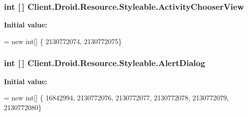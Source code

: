 \subsubsection[{Activity\+Chooser\+View}]{\setlength{\rightskip}{0pt plus 5cm}int \mbox{[}$\,$\mbox{]} Client.\+Droid.\+Resource.\+Styleable.\+Activity\+Chooser\+View\hspace{0.3cm}{\ttfamily [static]}}\label{classClient_1_1Droid_1_1Resource_1_1Styleable_a76fb7f3f865f999c48cefc7f3e0d010b}
{\bfseries Initial value\+:}
\begin{DoxyCode}
= \textcolor{keyword}{new} \textcolor{keywordtype}{int}[]
            \{
                    2130772074,
                    2130772075\}
\end{DoxyCode}
\hypertarget{classClient_1_1Droid_1_1Resource_1_1Styleable_ab0a0ece34f1e064fe26556955a3ba6c2}{}
\subsubsection[{Alert\+Dialog}]{\setlength{\rightskip}{0pt plus 5cm}int \mbox{[}$\,$\mbox{]} Client.\+Droid.\+Resource.\+Styleable.\+Alert\+Dialog\hspace{0.3cm}{\ttfamily [static]}}\label{classClient_1_1Droid_1_1Resource_1_1Styleable_ab0a0ece34f1e064fe26556955a3ba6c2}
{\bfseries Initial value\+:}
\begin{DoxyCode}
= \textcolor{keyword}{new} \textcolor{keywordtype}{int}[]
            \{
                    16842994,
                    2130772076,
                    2130772077,
                    2130772078,
                    2130772079,
                    2130772080\}
\end{DoxyCode}
\hypertarget{classClient_1_1Droid_1_1Resource_1_1Styleable_ad6d7332f96413093171c7cad3eca2387}{}
